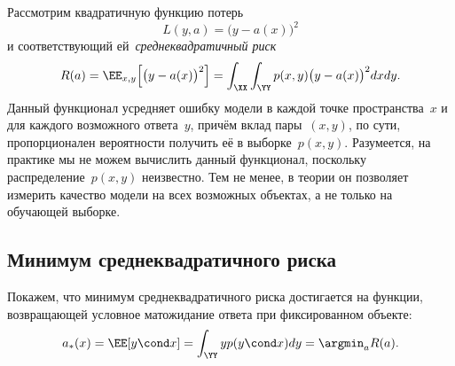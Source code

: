 \documentclass[12pt,fleqn]{article}
\begin{document}
Рассмотрим квадратичную функцию потерь
\[
    L(y, a)
    =
    \bigl(
        y - a(x)
    \bigr)^2
\]
и соответствующий ей~\emph{среднеквадратичный риск}
\[
    R(a)
    =
    \EE_{x, y}\Bigl[
        \bigl(
            y - a(x)
        \bigr)^2
    \Bigr]
    =
    \int_\XX
    \int_\YY
        p(x, y)
        \bigl(
            y - a(x)
        \bigr)^2
    dx
    dy.
\]
Данный функционал усредняет ошибку модели в каждой точке пространства~$x$ и для каждого
возможного ответа~$y$, причём вклад пары~$(x, y)$, по сути,
пропорционален вероятности получить её в выборке~$p(x, y)$.
Разумеется, на практике мы не можем вычислить данный функционал,
поскольку распределение~$p(x, y)$ неизвестно.
Тем не менее, в теории он позволяет измерить качество модели
на всех возможных объектах, а не только на обучающей выборке.

\subsection{Минимум среднеквадратичного риска}
Покажем, что минимум среднеквадратичного риска достигается
на функции, возвращающей условное матожидание ответа при фиксированном объекте:
\[
    a_*(x)
    =
    \EE[y \cond x]
    =
    \int_{\YY}
        y p(y \cond x)
    dy
    =
    \argmin_{a} R(a).
\]
\end{document}
